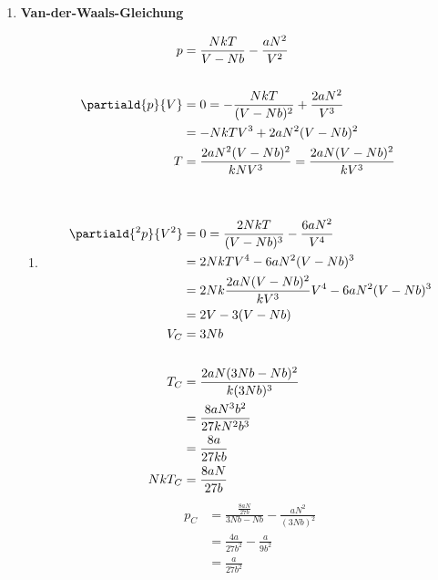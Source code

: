 \documentclass[11pt,letterpaper]{article}
\begin{document}
\begin{enumerate}
    
    \item \textbf{Van-der-Waals-Gleichung}
        \begin{enumerate}
            \item
            \begin{align*}
                p &= \frac{N k T}{V - N b} - \frac{a N^2}{V^2}\\
                \\
                \partiald{p}{V} &= 0 = -\frac{N k T}{(V - N b)^2} +  \frac{2 a N^2}{V^3}\\
                &= -N k T V^3 +  2 a N^2(V - N b)^2\\
                T &=  \frac{2 a N^2(V - N b)^2}{k N V^3}=  \frac{2 a N(V - N b)^2}{k V^3}\\\\
                \\
                \partiald{^2p}{V^2} &= 0 =  \frac{2 N k T}{(V - N b)^3} -  \frac{6 a N^2}{V^4}\\
                &=  2 N k T V^4 -  6 a N^2 (V - N b)^3\\
                &=  2 N k \frac{2 a N(V - N b)^2}{k V^3} V^4 -  6 a N^2 (V - N b)^3\\
                &= 2 V -  3 (V - N b)\\
                V_C &= 3 N b\\
                \\
                T_C &=  \frac{2 a N(3 N b - N b)^2}{k (3 N b)^3}\\
                &=  \frac{8 a N^3 b^2}{27 k N^2 b^3}\\
                &=  \frac{8 a}{27 k b}\\
                N k T_C &=  \frac{8 a N}{27 b}\\
            \end{align*}
            \begin{align*}
                p_C &= \frac{\frac{8 a N}{27 b}}{3 N b - N b} - \frac{a N^2}{(3 N b)^2}\\
                &= \frac{4 a}{27 b^2} - \frac{a}{9 b^2}\\
                &= \frac{a}{27 b^2} \\
            \end{align*}


\end{enumerate}
\end{enumerate}
\end{document}

